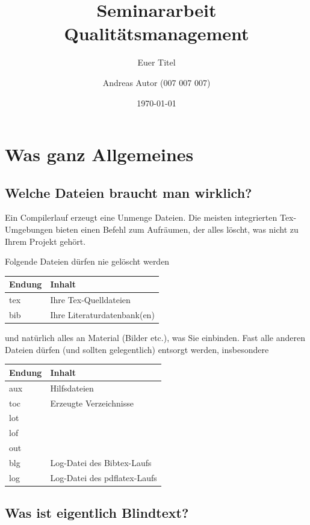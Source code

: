 \documentclass []{scrartcl}
\title{Seminararbeit Qualitätsmanagement}
\subtitle{Euer Titel}
\author{Andreas Autor (007 007 007)}
\date{\today}
\begin{document}
\maketitle

\tableofcontents
\pagestyle{scrheadings}
\chead{}		%
\ihead{\leftmark}	%
 \section{Was ganz Allgemeines}
\subsection{Welche Dateien braucht man wirklich?}
Ein Compilerlauf erzeugt eine Unmenge Dateien. Die meisten integrierten Tex-Umgebungen bieten einen Befehl zum Aufräumen, der alles löscht, was nicht zu Ihrem Projekt gehört.

Folgende Dateien dürfen nie gelöscht werden

\begin{tabu}{|X[0.5] | X[3] |}
\hline
\rowfont{\bfseries} Endung & Inhalt \\
\hline
tex & Ihre Tex-Quelldateien\\
bib & Ihre Literaturdatenbank(en)\\
\hline
\end{tabu}
und natürlich alles an Material (Bilder etc.), was Sie einbinden. Fast alle anderen Dateien dürfen (und sollten gelegentlich) entsorgt werden, insbesondere

\begin{tabu}{|X[0.5] | X[3] |}
\hline
\rowfont{\bfseries} Endung & Inhalt \\
\hline
aux & Hilfsdateien\\
toc & Erzeugte Verzeichnisse\\
lot & \\
lof & \\
out & \\
blg & Log-Datei des Bibtex-Laufs \\
log & Log-Datei des pdflatex-Laufs\\
\hline
\end{tabu}


\subsection{Was ist eigentlich Blindtext?}
\end{document}
